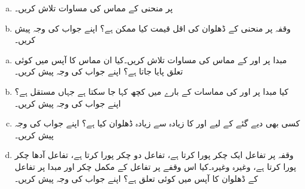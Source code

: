 \begin{enumerate}[a.]

\item
{} پر منحنی  کے مماس کی مساوات تلاش کریں۔
\item
وقفہ  پر منحنی کے  ڈھلوان کی اقل قیمت کیا ممکن ہے؟ اپنے جواب کی وجہ پیش کریں۔
\end{enumerate}
\begin{enumerate}[a.]

\item
مبدا پر  اور  کے مماس کی مساوات  تلاش کریں۔کیا ان مماس کا آپس میں کوئی تعلق پایا جاتا ہے؟ اپنے جواب کی وجہ پیش کریں۔
\item
کیا مبدا پر  اور  کی  مماسات کے بارے میں کچھ کہا جا سکتا ہے  جہاں مستقل  ہے؟ اپنے جواب کی وجہ پیش کریں۔
\item
کسی بھی دیے گئے  کے لیے  اور  کا زیادہ سے زیادہ ڈھلوان کیا ہے؟ اپنے جواب کی وجہ پیش کریں۔
\item
وقفہ  پر تفاعل  ایک  چکر پورا کرتا ہے، تفاعل  دو چکر پورا  کرتا ہے، تفاعل  آدھا چکر پورا کرتا ہے، وغیرہ وغیرہ۔کیا اس وقفے پر تفاعل  کے مکمل چکر اور مبدا پر تفاعل کے ڈھلوان کا آپس میں کوئی تعلق ہے؟ اپنے جواب کی وجہ پیش کریں۔ 
\end{enumerate}


